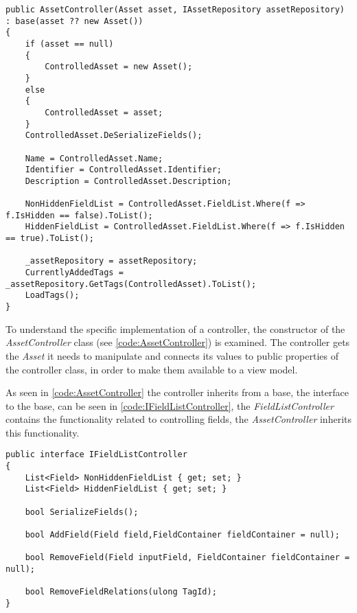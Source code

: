 \begin{listing}[H]
\begin{verbatim}
public AssetController(Asset asset, IAssetRepository assetRepository) : base(asset ?? new Asset())
{
    if (asset == null)
    {
        ControlledAsset = new Asset();
    }
    else
    {
        ControlledAsset = asset;
    }
    ControlledAsset.DeSerializeFields();

    Name = ControlledAsset.Name;
    Identifier = ControlledAsset.Identifier;
    Description = ControlledAsset.Description;
    
    NonHiddenFieldList = ControlledAsset.FieldList.Where(f => f.IsHidden == false).ToList();
    HiddenFieldList = ControlledAsset.FieldList.Where(f => f.IsHidden == true).ToList();
    
    _assetRepository = assetRepository;
    CurrentlyAddedTags = _assetRepository.GetTags(ControlledAsset).ToList();
    LoadTags();
}

\end{verbatim}
\label{code:AssetController}
\end{listing}

To understand the specific implementation of a controller, the constructor of the \textit{AssetController} class (see \autoref{code:AssetController}) is examined. The controller gets the \textit{Asset} it needs to manipulate and connects its values to public properties of the controller class, in order to make them available to a view model. 
\par
As seen in \autoref{code:AssetController} the controller inherits from a base, the interface to the base, can be seen in \autoref{code:IFieldListController}, the \textit{FieldListController} contains the functionality related to controlling fields, the \textit{AssetController} inherits this functionality.

\begin{listing}[H]
\begin{verbatim}
public interface IFieldListController
{
    List<Field> NonHiddenFieldList { get; set; }
    List<Field> HiddenFieldList { get; set; }

    bool SerializeFields();

    bool AddField(Field field,FieldContainer fieldContainer = null);

    bool RemoveField(Field inputField, FieldContainer fieldContainer = null);

    bool RemoveFieldRelations(ulong TagId);
}
\end{verbatim}
\label{code:IFieldListController}
\end{listing}

